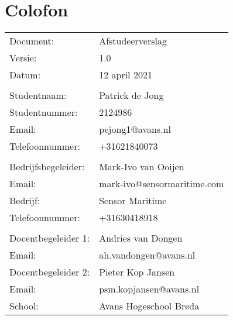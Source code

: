 \chapter*{Colofon}
\begin{table}[h!]
	\begin{tabular}{p{5cm}l}
	Document:           & Afstudeerverslag            \\
	Versie:             & 1.0                         \\
	Datum:              & 12 april 2021               \\
						&                             \\
	Studentnaam:        & Patrick de Jong             \\
	Studentnummer:      & 2124986                     \\
	Email:              & pejong1@avans.nl            \\
	Telefoonnummer:     & +31621840073                \\
						&                             \\
	Bedrijfsbegeleider: & Mark-Ivo van Ooijen         \\
	Email:              & mark-ivo@sensormaritime.com \\
	Bedrijf:            & Sensor Maritime             \\
	Telefoonnummer:     & +31630418918                \\
						&                             \\
	Docentbegeleider 1: & Andries van Dongen          \\
	Email:              & ah.vandongen@avans.nl       \\
	Docentbegeleider 2: & Pieter Kop Jansen           \\
	Email:              & psm.kopjansen@avans.nl      \\
	School:             & Avans Hogeschool Breda     
	\end{tabular}
\end{table}